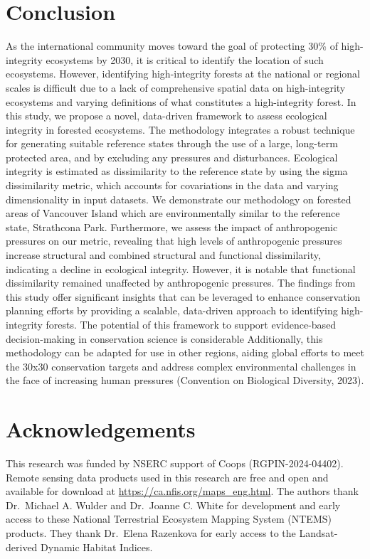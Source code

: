 \documentclass[
]{agujournal2019}
\begin{document}
\section{Conclusion}\label{conclusion}

As the international community moves toward the goal of protecting 30\%
of high-integrity ecosystems by 2030, it is critical to identify the
location of such ecosystems. However, identifying high-integrity forests
at the national or regional scales is difficult due to a lack of
comprehensive spatial data on high-integrity ecosystems and varying
definitions of what constitutes a high-integrity forest. In this study,
we propose a novel, data-driven framework to assess ecological integrity
in forested ecosystems. The methodology integrates a robust technique
for generating suitable reference states through the use of a large,
long-term protected area, and by excluding any pressures and
disturbances. Ecological integrity is estimated as dissimilarity to the
reference state by using the sigma dissimilarity metric, which accounts
for covariations in the data and varying dimensionality in input
datasets. We demonstrate our methodology on forested areas of Vancouver
Island which are environmentally similar to the reference state,
Strathcona Park. Furthermore, we assess the impact of anthropogenic
pressures on our metric, revealing that high levels of anthropogenic
pressures increase structural and combined structural and functional
dissimilarity, indicating a decline in ecological integrity. However, it
is notable that functional dissimilarity remained unaffected by
anthropogenic pressures. The findings from this study offer significant
insights that can be leveraged to enhance conservation planning efforts
by providing a scalable, data-driven approach to identifying
high-integrity forests. The potential of this framework to support
evidence-based decision-making in conservation science is considerable
Additionally, this methodology can be adapted for use in other regions,
aiding global efforts to meet the 30x30 conservation targets and address
complex environmental challenges in the face of increasing human
pressures (Convention on Biological Diversity, 2023).

\section{Acknowledgements}\label{acknowledgements}

This research was funded by NSERC support of Coops (RGPIN-2024-04402).
Remote sensing data products used in this research are free and open and
available for download at \url{https://ca.nfis.org/maps_eng.html}. The
authors thank Dr.~Michael A. Wulder and Dr.~Joanne C. White for
development and early access to these National Terrestrial Ecosystem
Mapping System (NTEMS) products. They thank Dr.~Elena Razenkova for
early access to the Landsat-derived Dynamic Habitat Indices.
\end{document}
